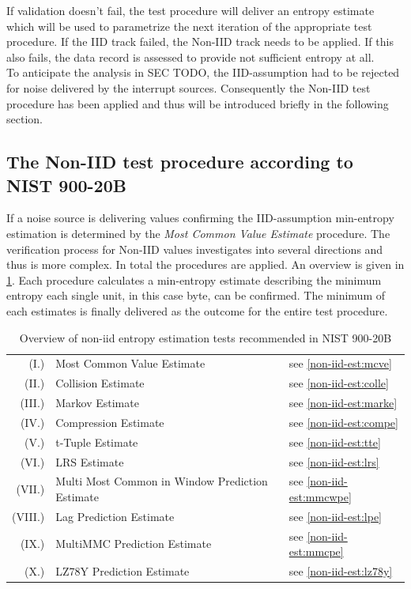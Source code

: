 If validation doesn't fail, the test procedure will deliver an entropy estimate which will be used to parametrize the next iteration of the appropriate test procedure. If the IID track failed, the Non-IID track needs to be applied. If this also fails, the data record is assessed to provide not sufficient entropy at all.\\
To anticipate the analysis in SEC TODO, the IID-assumption had to be rejected for noise delivered by the interrupt sources. Consequently the Non-IID test procedure has been applied and thus will be introduced briefly in the following section.

\subsection{The Non-IID test procedure according to NIST 900-20B}\label{sub:non-iid-test-proc}
\setcounter{secnumdepth}{3}
If a noise source is delivering values confirming the IID-assumption min-entropy estimation is determined by the \textit{Most Common Value Estimate} procedure. The verification process for Non-IID values investigates into several directions and thus is more complex. In total the procedures are applied. An overview is given in \ref{non-iid-est:tab-overview}. Each procedure calculates a min-entropy estimate describing the minimum entropy each single unit, in this case byte, can be confirmed. The minimum of each estimates is finally delivered as the outcome for the entire test procedure. 
 
\begin{table}[H]
	\centering
	\begin{tabular}{rll}
		\hline \hline
		(I.)& Most Common Value Estimate & see \ref{non-iid-est:mcve} \\ 
		(II.)& Collision Estimate & see \ref{non-iid-est:colle} \\ 
		(III.)& Markov Estimate & see \ref{non-iid-est:marke} \\ 
		(IV.)& Compression Estimate & see \ref{non-iid-est:compe} \\ 
		(V.)& t-Tuple Estimate & see \ref{non-iid-est:tte} \\ 
		(VI.)& LRS Estimate & see \ref{non-iid-est:lrs} \\ 
		(VII.)& Multi Most Common in Window Prediction Estimate & see \ref{non-iid-est:mmcwpe} \\ 
		(VIII.)& Lag Prediction Estimate & see \ref{non-iid-est:lpe} \\ 
		(IX.)& MultiMMC Prediction Estimate & see \ref{non-iid-est:mmcpe} \\ 
		(X.)& LZ78Y Prediction Estimate & see \ref{non-iid-est:lz78y} \\ \hline \hline
	\end{tabular}
	\label{non-iid-est:tab-overview}
	\caption{Overview of non-iid entropy estimation tests recommended in NIST 900-20B}
\end{table}


